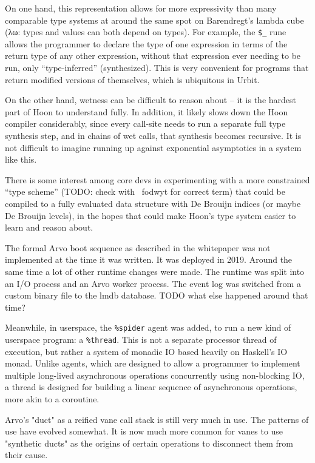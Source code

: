 \documentclass[twoside]{article}
\begin{document}
On one hand, this representation allows for more expressivity than many comparable type systems at around the same spot on Barendregt's lambda cube (λω: types and values can both depend on types).  For example, the \lstinline[style=inlinecode]{$_} rune allows the programmer to declare the type of one expression in terms of the return type of any other expression, without that expression ever needing to be run, only ``type-inferred'' (synthesized).  This is very convenient for programs that return modified versions of themselves, which is ubiquitous in Urbit.

On the other hand, wetness can be difficult to reason about – it is the hardest part of Hoon to understand fully.  In addition, it likely slows down the Hoon compiler considerably, since every call-site needs to run a separate full type synthesis step, and in chains of wet calls, that synthesis becomes recursive.  It is not difficult to imagine running up against exponential asymptotics in a system like this.

There is some interest among core devs in experimenting with a more constrained ``type scheme'' (TODO: check with ~fodwyt for correct term) that could be compiled to a fully evaluated data structure with De Brouijn indices (or maybe De Brouijn levels), in the hopes that could make Hoon's type system easier to learn and reason about.

The formal Arvo boot sequence as described in the whitepaper was not implemented at the time it was written.  It was deployed in 2019.  Around the same time a lot of other runtime changes were made.  The runtime was split into an I/O process and an Arvo worker process.  The event log was switched from a custom binary file to the {\sc lmdb} database.  TODO what else happened around that time?

Meanwhile, in userspace, the \lstinline[style=inlinecode]{%spider} agent was added, to run a new kind of userspace program: a \lstinline[style=inlinecode]{%thread}.  This is not a separate processor thread of execution, but rather a system of monadic IO based heavily on Haskell's IO monad.  Unlike agents, which are designed to allow a programmer to implement multiple long-lived asynchronous operations concurrently using non-blocking IO, a thread is designed for building a linear sequence of asynchronous operations, more akin to a coroutine.

Arvo's "duct" as a reified vane call stack is still very much in use.  The patterns of use have evolved somewhat.  It is now much more common for vanes to use "synthetic ducts" as the origins of certain operations to disconnect them from their cause.
\end{document}
